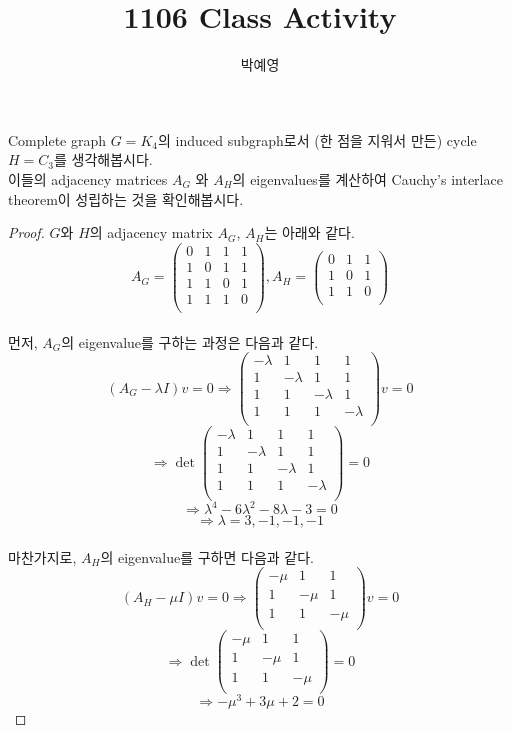 \documentclass[a4paper, 12pt]{article}
\title{1106 Class Activity}
\author{박예영}
\begin{document}
\maketitle
\begin{mdframed}
Complete graph $G=K_4$의 induced subgraph로서 (한 점을 지워서 만든) cycle $H=C_3$를 생각해봅시다. 
\\
이들의 adjacency matrices $A_G$ 와 $A_H$의 eigenvalues를 계산하여 Cauchy's interlace theorem이 성립하는 것을 확인해봅시다. 

\end{mdframed}

\begin{proof}
$G$와 $H$의 adjacency matrix $A_G$, $A_H$는 아래와 같다.
$$A_G = \begin{pmatrix} 0 & 1 & 1 & 1 \\ 1 & 0 & 1 & 1 \\ 1 & 1 & 0 & 1 \\ 1 & 1 & 1 & 0 \\ \end{pmatrix}, A_H = \begin{pmatrix} 0 & 1 & 1 \\ 1 & 0 & 1 \\ 1 & 1 & 0 \\ \end{pmatrix}$$\\
먼저, $A_G$의 eigenvalue를 구하는 과정은 다음과 같다.\\
$$(A_G-\lambda I)v = 0 \Rightarrow \begin{pmatrix} -\lambda & 1 & 1 & 1 \\ 1 & -\lambda & 1 & 1 \\ 1 & 1 & -\lambda & 1 \\ 1 & 1 & 1 & -\lambda \\ \end{pmatrix} v = 0$$ $$\Rightarrow \det \begin{pmatrix} -\lambda & 1 & 1 & 1 \\ 1 & -\lambda & 1 & 1 \\ 1 & 1 & -\lambda & 1 \\ 1 & 1 & 1 & -\lambda \\ \end{pmatrix} = 0$$ $$\Rightarrow \lambda^4 - 6 \lambda^2 - 8 \lambda -3 = 0$$
$$\Rightarrow \lambda = 3, -1, -1, -1$$\\
마찬가지로, $A_H$의 eigenvalue를 구하면 다음과 같다.\\
$$(A_H-\mu I)v = 0 \Rightarrow \begin{pmatrix} -\mu & 1 & 1 \\ 1 & -\mu & 1 \\ 1 & 1 & -\mu\\ \end{pmatrix} v = 0$$ $$\Rightarrow \det \begin{pmatrix} -\mu & 1 & 1 \\ 1 & -\mu & 1 \\ 1 & 1 & -\mu\\ \end{pmatrix} = 0$$ $$\Rightarrow -\mu^3 + 3 \mu +2 = 0$$

\end{proof}
\end{document}
